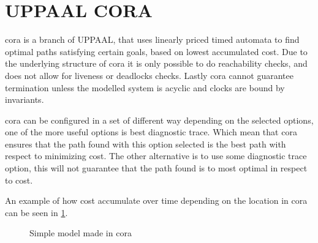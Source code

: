 \section{UPPAAL CORA} \label{sec:upp_cora}
\acrfull{cora} is a branch of UPPAAL, that uses linearly priced timed automata to find optimal paths satisfying certain goals, based on lowest accumulated cost\cite{cs_cora}. Due to the underlying structure of \gls{cora} it is only possible to do reachability checks, and does not allow for liveness or deadlocks checks. Lastly \gls{cora} cannot guarantee termination unless the modelled system is acyclic and clocks are bound by invariants\cite{uppaal_cora_download}.

\gls{cora} can be configured in a set of different way depending on the selected options, one of the more useful options is best diagnostic trace. Which mean that \gls{cora} ensures that the path found with this option selected is the best path with respect to minimizing cost. The other alternative is to use some diagnostic trace option, this will not guarantee that the path found is to most optimal in respect to cost.

An example of how cost accumulate over time depending on the location in \gls{cora} can be seen in \cref{fig:cora_eks}.

\begin{figure}[H]
	\centering
	\caption{Simple model made in \gls{cora}}
	\label{fig:cora_eks}
\end{figure}

